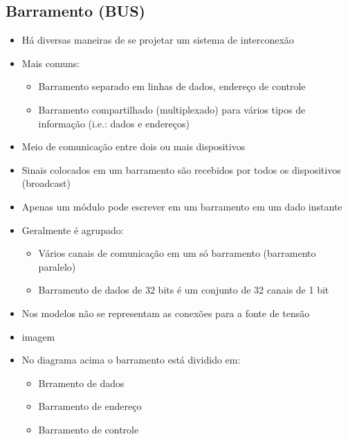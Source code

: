 \documentclass[12pt]{article}
\begin{document}
    \subsection{Barramento (BUS)}
    \begin{itemize}
        \item Há diversas maneiras de se projetar um sistema de interconexão
        \item Mais comuns: 
        \begin{itemize}
            \item Barramento separado em linhas de dados, endereço de controle
            \item Barramento compartilhado (multiplexado) para vários tipos de 
            informação (i.e.: dados e endereços)
        \end{itemize}
        \item Meio de comunicação entre dois ou mais dispositivos
        \item Sinais colocados em um barramento são recebidos por todos os 
        dispositivos (broadcast)
        \item Apenas um módulo pode escrever em um barramento em um dado instante
        \item Geralmente é agrupado:
        \begin{itemize}
            \item Vários canais de comunicação em um só barramento (barramento 
            paralelo)
            \item Barramento de dados de 32 bits é um conjunto de 32 canais de 
            1 bit
        \end{itemize}
        \item Nos modelos não se representam as conexões para a fonte de tensão
        \item[] imagem
        \item No diagrama acima o barramento está dividido em:
        \begin{itemize}
            \item Brramento de dados
            \item Barramento de endereço
            \item Barramento de controle
        \end{itemize}
    \end{itemize}
\end{document}
